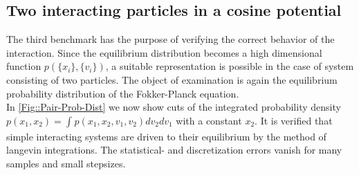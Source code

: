 	\subsection{Two interacting particles in a cosine potential}
	The third benchmark has the purpose of verifying the correct behavior of the interaction. Since the equilibrium distribution becomes a high dimensional function $p(\{x_i\}, \{v_i\})$, a suitable representation is possible in the case of system consisting of two particles. The object of examination is again the equilibrium probability distribution of the Fokker-Planck equation.\\
	
	In \autoref{Fig::Pair-Prob-Dist} we now show cuts of the integrated probability density $p(x_1, x_2) =	\int_{} p(x_1, x_2, v_1, v_2) dv_2 dv_1$ with a constant $x_2$. It is verified that simple interacting systems are driven to their equilibrium by the method of langevin integrations. The statistical- and discretization errors vanish for many samples and small stepsizes.
	
